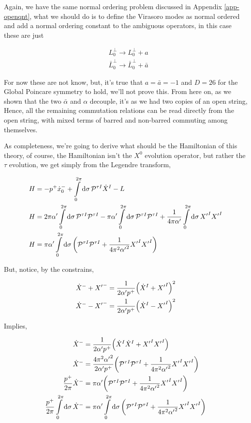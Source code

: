 Again, we have the same normal ordering problem discussed in Appendix \ref{app-openqnt}, what we should do is to define the Virasoro modes as normal ordered and add a normal 
ordering constant to the ambiguous operators, in this case these are just

\begin{align*}
    &L^\perp_0\rightarrow L_0^\perp+a\\
    &{\bar L}^\perp_0\rightarrow {\bar L}_0^\perp+\bar a
\end{align*}

For now these are not know, but, it's true that $a=\bar a=-1$ and $D=26$ for the Global Poincare symmetry to hold, we'll not prove this. From here on, as we shown that the two $\bar\alpha$ and 
$\alpha$ decouple, it's as we had two copies of an open string, Hence, all the remaining commutation relations can be read directly from the open string, with mixed terms of barred and non-barred 
commuting among themselves.

As completeness, we're going to derive what should be the Hamiltonian of this theory, of course, the Hamiltonian isn't the $X^0$ 
evolution operator, but rather the $\tau$ evolution, we get simply from the Legendre transform,

\begin{align*}
    H&=-p^+{\dot x}_0^-+\int\limits_0^{2\pi}\dd{\sigma}\mathcal P^{\tau I}{\dot X}^I-L\\
    H&=2\pi\alpha'\int\limits_0^{2\pi}\dd{\sigma}\mathcal P^{\tau I}\mathcal P^{\tau I}-\pi\alpha'\int\limits_0^{2\pi}\dd{\sigma}\mathcal P^{\tau I}\mathcal P^{\tau I}+\frac{1}{4\pi\alpha'}\int\limits_0^{2\pi}\dd{\sigma}{X'}^I{X'}^I\\
    H&=\pi\alpha'\int\limits_0^{2\pi}\dd{\sigma}\qty(\mathcal P^{\tau I}\mathcal P^{\tau I}+\frac{1}{4\pi^2{\alpha'}^2}{X'}^I{X'}^I)
\end{align*}

But, notice, by the constrains,

\begin{align*}
    {\dot X}^-+{X'}^-&=\frac{1}{2\alpha'p^+}\qty({\dot X}^I+{X'}^I)^2\\
    {\dot X}^--{X'}^-&=\frac{1}{2\alpha'p^+}\qty({\dot X}^I-{X'}^I)^2\\
\end{align*}

Implies,

\begin{align*}
    {\dot X}^-&=\frac{1}{2\alpha'p^+}\qty({\dot X}^I{\dot X}^I+{X'}^I{X'}^I)\\
    {\dot X}^-&=\frac{4\pi^2{\alpha'}^2}{2\alpha'p^+}\qty(\mathcal P^{\tau I}\mathcal P^{\tau I}+\frac{1}{4\pi^2{\alpha'}^2}{X'}^I{X'}^I)\\
    \frac{p^+}{2\pi}{\dot X}^-&=\pi\alpha'\qty(\mathcal P^{\tau I}\mathcal P^{\tau I}+\frac{1}{4\pi^2{\alpha'}^2}{X'}^I{X'}^I)\\
    \frac{p^+}{2\pi}\int\limits_0^{2\pi}\dd{\sigma}{\dot X}^-&=\pi\alpha'\int\limits_0^{2\pi}\dd{\sigma}\qty(\mathcal P^{\tau I}\mathcal P^{\tau I}+\frac{1}{4\pi^2{\alpha'}^2}{X'}^I{X'}^I)
\end{align*}

